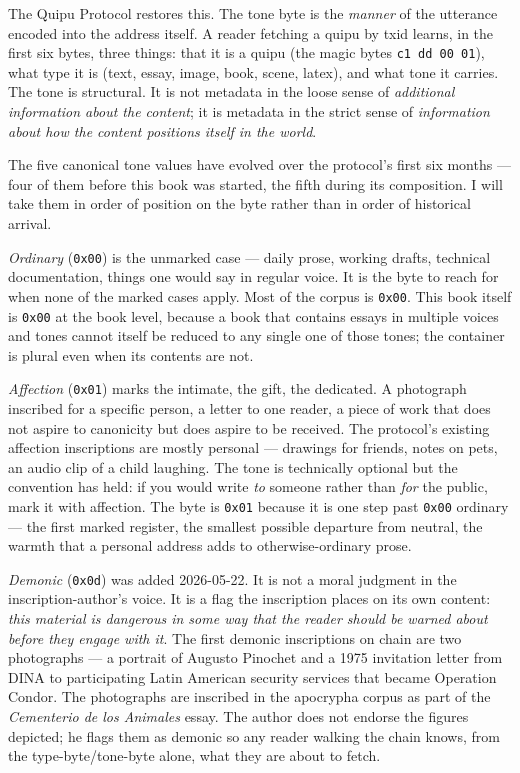 \documentclass[11pt,openany]{book}
\begin{document}
The Quipu Protocol restores this. The tone byte is the \emph{manner} of the utterance encoded into the address itself. A reader fetching a quipu by txid learns, in the first six bytes, three things: that it is a quipu (the magic bytes \texttt{c1 dd 00 01}), what type it is (text, essay, image, book, scene, latex), and what tone it carries. The tone is structural. It is not metadata in the loose sense of \emph{additional information about the content}; it is metadata in the strict sense of \emph{information about how the content positions itself in the world}.

The five canonical tone values have evolved over the protocol's first six months — four of them before this book was started, the fifth during its composition. I will take them in order of position on the byte rather than in order of historical arrival.

\emph{Ordinary} (\texttt{0x00}) is the unmarked case — daily prose, working drafts, technical documentation, things one would say in regular voice. It is the byte to reach for when none of the marked cases apply. Most of the corpus is \texttt{0x00}. This book itself is \texttt{0x00} at the book level, because a book that contains essays in multiple voices and tones cannot itself be reduced to any single one of those tones; the container is plural even when its contents are not.

\emph{Affection} (\texttt{0x01}) marks the intimate, the gift, the dedicated. A photograph inscribed for a specific person, a letter to one reader, a piece of work that does not aspire to canonicity but does aspire to be received. The protocol's existing affection inscriptions are mostly personal — drawings for friends, notes on pets, an audio clip of a child laughing. The tone is technically optional but the convention has held: if you would write \emph{to} someone rather than \emph{for} the public, mark it with affection. The byte is \texttt{0x01} because it is one step past \texttt{0x00} ordinary — the first marked register, the smallest possible departure from neutral, the warmth that a personal address adds to otherwise-ordinary prose.

\emph{Demonic} (\texttt{0x0d}) was added 2026-05-22. It is not a moral judgment in the inscription-author's voice. It is a flag the inscription places on its own content: \emph{this material is dangerous in some way that the reader should be warned about before they engage with it}. The first demonic inscriptions on chain are two photographs — a portrait of Augusto Pinochet and a 1975 invitation letter from DINA to participating Latin American security services that became Operation Condor. The photographs are inscribed in the apocrypha corpus as part of the \emph{Cementerio de los Animales} essay. The author does not endorse the figures depicted; he flags them as demonic so any reader walking the chain knows, from the type-byte/tone-byte alone, what they are about to fetch.
\end{document}
